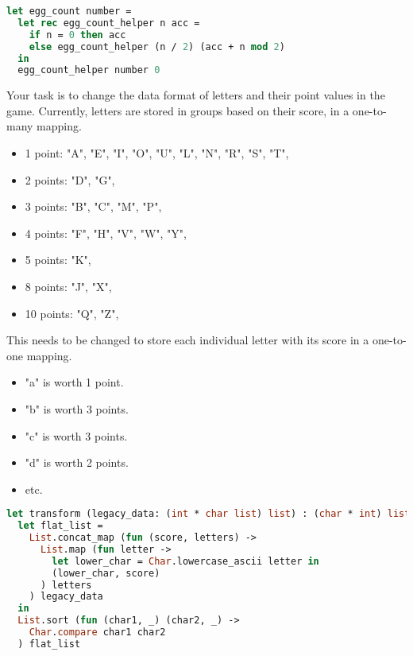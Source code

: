 \begin{lstlisting}[language=OCaml]
let egg_count number =
  let rec egg_count_helper n acc =
    if n = 0 then acc
    else egg_count_helper (n / 2) (acc + n mod 2)
  in
  egg_count_helper number 0
\end{lstlisting}

Your task is to change the data format of letters and their point values in the game.
Currently, letters are stored in groups based on their score, in a one-to-many mapping.
\begin{itemize}
  \item 1 point: "A", "E", "I", "O", "U", "L", "N", "R", "S", "T",
  \item 2 points: "D", "G",
  \item 3 points: "B", "C", "M", "P",
  \item 4 points: "F", "H", "V", "W", "Y",
  \item 5 points: "K",
  \item 8 points: "J", "X",
  \item 10 points: "Q", "Z",
\end{itemize}
This needs to be changed to store each individual letter with its score in a one-to-one mapping.
\begin{itemize}
  \item "a" is worth 1 point.
  \item "b" is worth 3 points.
  \item "c" is worth 3 points.
  \item "d" is worth 2 points.
  \item etc.
\end{itemize}

\begin{lstlisting}[language=OCaml]
let transform (legacy_data: (int * char list) list) : (char * int) list =
  let flat_list =
    List.concat_map (fun (score, letters) ->
      List.map (fun letter ->
        let lower_char = Char.lowercase_ascii letter in
        (lower_char, score)
      ) letters
    ) legacy_data
  in
  List.sort (fun (char1, _) (char2, _) ->
    Char.compare char1 char2
  ) flat_list
\end{lstlisting}

